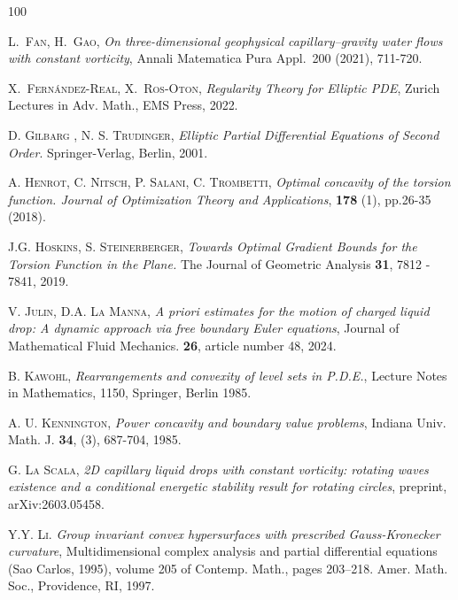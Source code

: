 \documentclass[10pt,reqno,a4paper]{article}
\numberwithin{equation}{section}
\theoremstyle{plain}
\theoremstyle{definition}
\newcommand{\R}{{\mathbb R}}
\begin{document}
\begin{thebibliography}{100}


 \textsc{L.\ Fan, H.\ Gao}, \emph{On three-dimensional geophysical capillary–gravity water flows with constant vorticity}, Annali Matematica Pura Appl.\ 200 (2021), 711-720. %

 \textsc{X.\  Fern\'andez-Real, X.\ Ros-Oton}, \emph{Regularity Theory for Elliptic PDE}, Zurich Lectures in Adv. Math., EMS Press, 2022.

 \textsc{D. Gilbarg , N. S. Trudinger}, {\it Elliptic Partial Differential Equations of Second Order}. Springer-Verlag, Berlin, 2001.
 
\textsc{A. Henrot, C. Nitsch, P. Salani, C. Trombetti}, \textit{ Optimal concavity of the torsion
function. Journal of Optimization Theory and Applications}, {\bf 178} (1), pp.26-35 (2018). 

\textsc{J.G. Hoskins, S. Steinerberger}, \textit{Towards Optimal Gradient Bounds for the Torsion Function in the Plane.} The Journal of Geometric Analysis {\bf 31}, 7812 - 7841, 2019.

\textsc{V. Julin, D.A. La Manna}, \textit{A priori estimates for the motion of charged liquid drop: A dynamic  approach via free boundary Euler equations}, Journal of Mathematical Fluid Mechanics. {\bf 26}, article number 48, 2024.

\textsc{B. Kawohl}, {\it Rearrangements and convexity of level sets in P.D.E.}, Lecture Notes in Mathematics, 1150, Springer, Berlin 1985.

\textsc{A. U. Kennington}, \textit{Power concavity and boundary value problems}, Indiana Univ. Math. J. {\bf 34}, (3), 687-704, 1985.

\textsc{G. La Scala}, \textit{2D capillary liquid drops with constant vorticity: rotating waves existence and a conditional energetic stability result for rotating circles}, preprint, arXiv:2603.05458.

\textsc{Y.Y. Li}. \textit{Group invariant convex hypersurfaces with prescribed Gauss-Kronecker curvature}, 
 Multidimensional complex analysis and partial diﬀerential equations (Sao Carlos, 1995), volume 205 of Contemp.
Math., pages 203–218. Amer. Math. Soc., Providence, RI, 1997.


\end{thebibliography}
\end{document}
